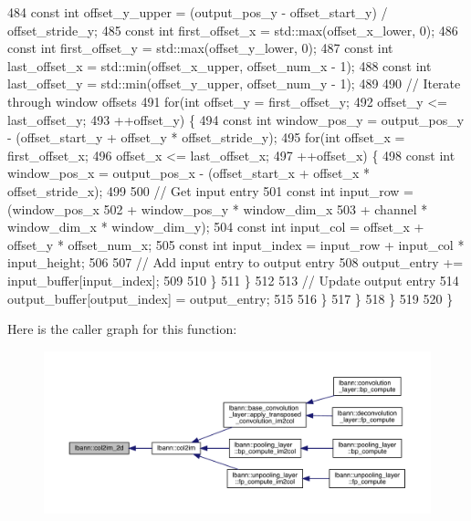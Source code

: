 \begin{DoxyCode}
484         \textcolor{keyword}{const} \textcolor{keywordtype}{int} offset\_y\_upper = (output\_pos\_y - offset\_start\_y) / offset\_stride\_y;
485         \textcolor{keyword}{const} \textcolor{keywordtype}{int} first\_offset\_x = std::max(offset\_x\_lower, 0);
486         \textcolor{keyword}{const} \textcolor{keywordtype}{int} first\_offset\_y = std::max(offset\_y\_lower, 0);
487         \textcolor{keyword}{const} \textcolor{keywordtype}{int} last\_offset\_x = std::min(offset\_x\_upper, offset\_num\_x - 1);
488         \textcolor{keyword}{const} \textcolor{keywordtype}{int} last\_offset\_y = std::min(offset\_y\_upper, offset\_num\_y - 1);
489 
490         \textcolor{comment}{// Iterate through window offsets}
491         \textcolor{keywordflow}{for}(\textcolor{keywordtype}{int} offset\_y = first\_offset\_y;
492             offset\_y <= last\_offset\_y;
493             ++offset\_y) \{
494           \textcolor{keyword}{const} \textcolor{keywordtype}{int} window\_pos\_y = output\_pos\_y - (offset\_start\_y + offset\_y * offset\_stride\_y);
495           \textcolor{keywordflow}{for}(\textcolor{keywordtype}{int} offset\_x = first\_offset\_x;
496               offset\_x <= last\_offset\_x;
497               ++offset\_x) \{
498             \textcolor{keyword}{const} \textcolor{keywordtype}{int} window\_pos\_x = output\_pos\_x - (offset\_start\_x + offset\_x * offset\_stride\_x);
499 
500             \textcolor{comment}{// Get input entry}
501             \textcolor{keyword}{const} \textcolor{keywordtype}{int} input\_row = (window\_pos\_x
502                                    + window\_pos\_y * window\_dim\_x
503                                    + channel * window\_dim\_x * window\_dim\_y);
504             \textcolor{keyword}{const} \textcolor{keywordtype}{int} input\_col = offset\_x + offset\_y * offset\_num\_x;
505             \textcolor{keyword}{const} \textcolor{keywordtype}{int} input\_index = input\_row + input\_col * input\_height;
506 
507             \textcolor{comment}{// Add input entry to output entry}
508             output\_entry += input\_buffer[input\_index];
509 
510           \}
511         \}
512 
513         \textcolor{comment}{// Update output entry}
514         output\_buffer[output\_index] = output\_entry;
515 
516       \}
517     \}
518   \}
519 
520 \}
\end{DoxyCode}
Here is the caller graph for this function\+:\nopagebreak
\begin{figure}[H]
\begin{center}
\leavevmode
\includegraphics[width=350pt]{namespacelbann_a1953674a43b284f0abb5c5e4db94b2b9_icgraph}
\end{center}
\end{figure}
